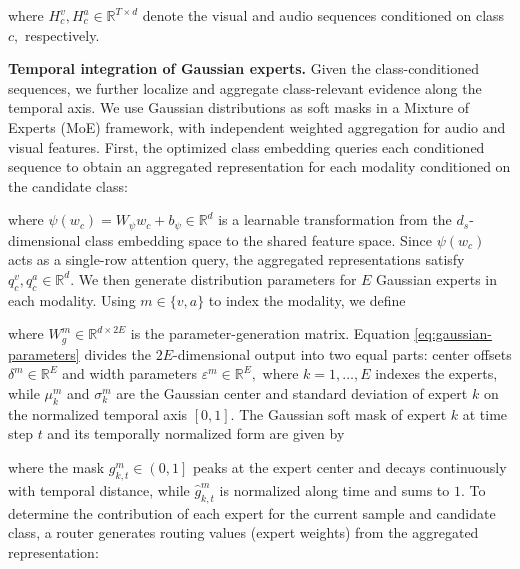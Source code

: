 


\noindent\unskip where ${H}_{c}^{v},{H}_{c}^{a}\in {\mathbb{R}}^{T\times d}$ denote the visual and audio sequences conditioned on class $c,$ respectively.

\textbf{Temporal integration of Gaussian experts. }Given the class-conditioned sequences, we further localize and aggregate class-relevant evidence along the temporal axis. We use Gaussian distributions as soft masks in a Mixture of Experts (MoE) framework, with independent weighted aggregation for audio and visual features. First, the optimized class embedding queries each conditioned sequence to obtain an aggregated representation for each modality conditioned on the candidate class:


\noindent\unskip where $\psi ({w}_{c})={W}_{\psi }{w}_{c}+{b}_{\psi }\in {\mathbb{R}}^{d}$ is a learnable transformation from the ${d}_{s}$-dimensional class embedding space to the shared feature space. Since $\psi ({w}_{c})$ acts as a single-row attention query, the aggregated representations satisfy ${q}_{c}^{v},{q}_{c}^{a}\in {\mathbb{R}}^{d}.$ We then generate distribution parameters for $E$ Gaussian experts in each modality. Using $m\in \{v,a\}$ to index the modality, we define




\noindent\unskip where ${W}_{g}^{m}\in {\mathbb{R}}^{d\times 2E}$ is the parameter-generation matrix. Equation \eqref{eq:gaussian-parameters} divides the $2E$-dimensional output into two equal parts: center offsets ${\delta }^{m}\in {\mathbb{R}}^{E}$ and width parameters ${\varepsilon }^{m}\in {\mathbb{R}}^{E},$ where $k=1,\ldots ,E$ indexes the experts, while ${\mu }_{k}^{m}$ and ${\sigma }_{k}^{m}$ are the Gaussian center and standard deviation of expert $k$ on the normalized temporal axis $[0,1].$ The Gaussian soft mask of expert $k$ at time step $t$ and its temporally normalized form are given by




\noindent\unskip where the mask ${g}_{k,t}^{m}\in \left( 0,1\right] $ peaks at the expert center and decays continuously with temporal distance, while ${\widehat{g}}_{k,t}^{m}$ is normalized along time and sums to $1.$ To determine the contribution of each expert for the current sample and candidate class, a router generates routing values (expert weights) from the aggregated representation:


